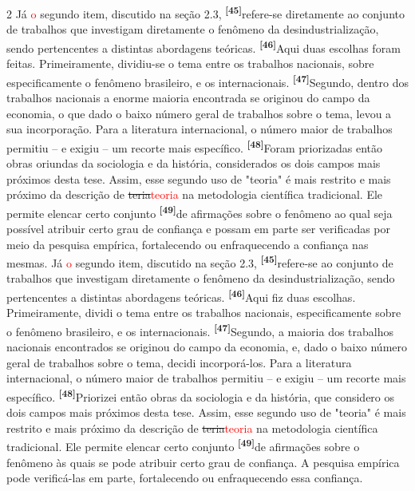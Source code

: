 \documentclass[10pt]{article}
\newcommand{\num}[2]{\textsuperscript{\textbf{\color{#1}[#2]}}}
\newcommand{\chgA}[2]{\num{antes}{#1}{\color{antes}#2}}
\newcommand{\chgD}[2]{\num{depois}{#1}{\color{depois}#2}}
\newcommand{\ia}[1]{\textcolor{red}{#1}}
\begin{document}
\begin{paracol}{2}
Já \ia{o} segundo item, discutido na seção 2.3, \chgA{45}{refere-se diretamente ao conjunto de trabalhos que investigam diretamente}
o fenômeno da desindustrialização, sendo pertencentes a distintas abordagens teóricas. \chgA{46}{Aqui duas escolhas
foram feitas. Primeiramente, dividiu-se o tema entre os trabalhos nacionais, sobre especificamente o
fenômeno brasileiro, e os internacionais.} \chgA{47}{Segundo, dentro dos trabalhos nacionais a enorme
maioria encontrada se originou do campo da economia, o que dado o baixo número geral de trabalhos
sobre o tema, levou a sua incorporação.} Para a literatura internacional, o número maior
de trabalhos permitiu -- e exigiu -- um recorte mais específico. \chgA{48}{Foram priorizadas então obras oriundas
da sociologia e da história, considerados os dois campos mais próximos desta tese.} Assim, esse segundo uso de "teoria" é mais restrito e
mais próximo da descrição de \sout{teria}\ia{teoria} na metodologia científica tradicional. Ele permite elencar certo conjunto
\chgA{49}{de afirmações sobre o fenômeno ao qual seja possível atribuir certo grau de confiança e possam
em parte ser verificadas por meio da pesquisa empírica, fortalecendo ou enfraquecendo a confiança nas mesmas.}
\switchcolumn[1]
Já \ia{o} segundo item, discutido na seção 2.3, \chgD{45}{refere-se ao conjunto de trabalhos que investigam diretamente}
o fenômeno da desindustrialização, sendo pertencentes a distintas abordagens teóricas. \chgD{46}{Aqui fiz duas escolhas. Primeiramente, dividi o tema entre os trabalhos nacionais, especificamente sobre o fenômeno brasileiro, e os internacionais.} \chgD{47}{Segundo, a maioria dos trabalhos nacionais encontrados se originou do campo da economia, e, dado o baixo número geral de trabalhos sobre o tema, decidi incorporá-los.} Para a literatura internacional, o número maior
de trabalhos permitiu -- e exigiu -- um recorte mais específico. \chgD{48}{Priorizei então obras da sociologia e da história, que considero os dois campos mais próximos desta tese.} Assim, esse segundo uso de "teoria" é mais restrito e
mais próximo da descrição de \sout{teria}\ia{teoria} na metodologia científica tradicional. Ele permite elencar certo conjunto
\chgD{49}{de afirmações sobre o fenômeno às quais se pode atribuir certo grau de confiança. A pesquisa empírica pode verificá-las em parte, fortalecendo ou enfraquecendo essa confiança.}

\end{paracol}
\end{document}
